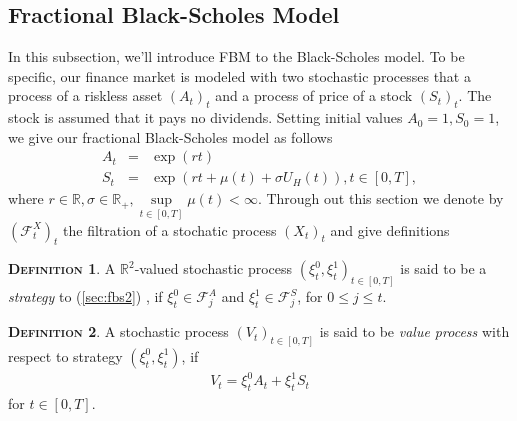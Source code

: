 \documentclass[a4paper, twoside, 11pt]{article}
\theoremstyle{definition}
\newtheorem{definition}{\scshape Definition}[section]
\begin{document}
\subsection{Fractional Black-Scholes Model}
In this subsection, we'll introduce FBM to the Black-Scholes model. To be specific, our finance market is modeled with two stochastic processes that a process of a riskless asset $(A_t)_t$ and a process of price of a stock $(S_t)_t$.  The stock is assumed that it pays no dividends. Setting initial values $A_0=1, S_0=1$, we give our fractional Black-Scholes model as follows
%
\begin{eqnarray}
  A_t &=& \exp(rt)\nonumber\\
  S_t &=& \exp(rt + \mu(t) +\sigma U_H(t)), t\in [0, T],
  \label{sec:fbs2}
\end{eqnarray}
where  $r\in\mathbb{R}, \sigma\in\mathbb{R}_+, \sup\limits_{t\in[0, T]}\mu(t) < \infty$.
 Through out this section we denote by $(\mathcal{F}^X_t)_t$ the filtration of a stochatic process $(X_t)_t$ and give definitions %

\begin{definition}
  A $\mathbb{R}^{2}$-valued stochastic process $(\xi_t^0, \xi_t^1)_{t\in [0, T]}$ is said to be a \emph{strategy} to (\ref{sec:fbs2}) , if $\xi_t^0 \in \mathcal{F}^A_{j}$ and $\xi_t^1 \in \mathcal{F}^S_j$, for $0\le j \le t$.
\end{definition}

\begin{definition}
  A stochastic process $(V_t)_{t\in[0, T]}$ is said to be \emph{value process} with respect to strategy $(\xi_t^0, \xi_t^1)$, if 
  \begin{eqnarray*}
	V_t =  \xi^0_t A_t + \xi^1_t S_t %
  \end{eqnarray*}
  for $t \in [0, T]$.
\end{definition}

\end{document}
